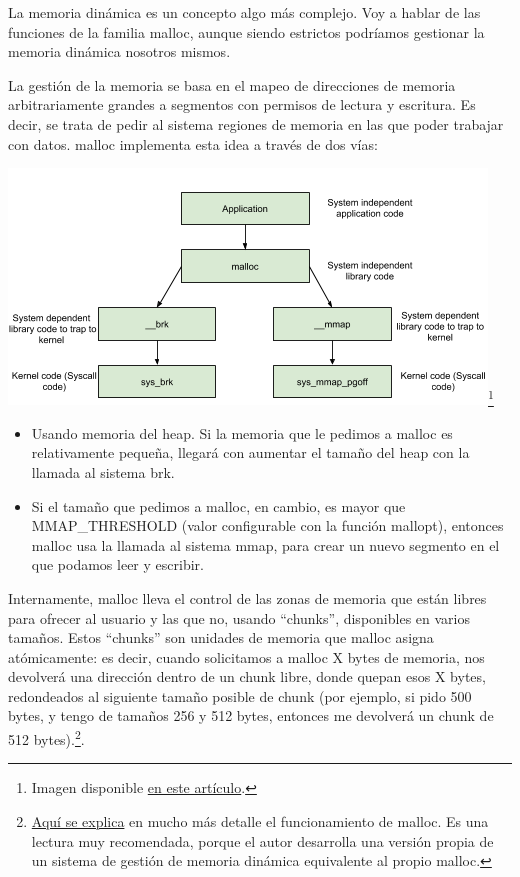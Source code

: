 \documentclass[a4paper]{article}
\begin{document}
La memoria dinámica es un concepto algo más complejo. Voy a hablar de las funciones de la familia {\ttfamily malloc}, aunque siendo estrictos podríamos gestionar la memoria dinámica nosotros mismos.

La gestión de la memoria se basa en el mapeo de direcciones de memoria arbitrariamente grandes a segmentos con permisos de lectura y escritura. Es decir, se trata de pedir al sistema regiones de memoria en las que poder trabajar con datos. {\ttfamily malloc} implementa esta idea a través de dos vías:

\begin{center}
    \includegraphics[scale=0.7]{malloc.png}\footnote{Imagen disponible \href{https://sploitfun.wordpress.com/2015/02/11/syscalls-used-by-malloc/}{en este artículo}.}
\end{center}


\begin{itemize}
    \item Usando memoria del {\ttfamily heap}. Si la memoria que le pedimos a {\ttfamily malloc} es relativamente pequeña, llegará con aumentar el tamaño del {\ttfamily heap} con la llamada al sistema {\ttfamily brk}.
    \item Si el tamaño que pedimos a {\ttfamily malloc}, en cambio, es mayor que {\ttfamily MMAP\_THRESHOLD} (valor configurable con la función {\ttfamily mallopt}), entonces {\ttfamily malloc} usa la llamada al sistema {\ttfamily mmap}, para crear un nuevo segmento en el que podamos leer y escribir.
\end{itemize}

Internamente, {\ttfamily malloc} lleva el control de las zonas de memoria que están libres para ofrecer al usuario y las que no, usando ``chunks'', disponibles en varios tamaños. Estos ``chunks'' son unidades de memoria que {\ttfamily malloc} asigna atómicamente: es decir, cuando solicitamos a {\ttfamily malloc} X bytes de memoria, nos devolverá una dirección dentro de un chunk libre, donde quepan esos X bytes, redondeados al siguiente tamaño posible de chunk (por ejemplo, si pido 500 bytes, y tengo de tamaños 256 y 512 bytes, entonces me devolverá un chunk de 512 bytes).\footnote{\href{https://danluu.com/malloc-tutorial/}{Aquí se explica} en mucho más detalle el funcionamiento de {\ttfamily malloc}. Es una lectura muy recomendada, porque el autor desarrolla una versión propia de un sistema de gestión de memoria dinámica equivalente al propio {\ttfamily malloc}.}.
\end{document}
